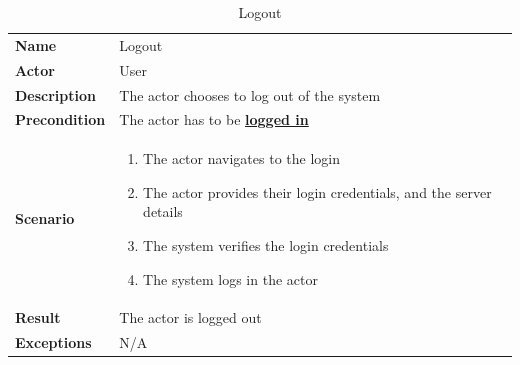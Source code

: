 \begin{table}[ht]
    \caption{Logout}
    \begin{tabular}{|L{5cm}|L{10cm}|}
        \toprule
        \textbf{Name}         & Logout                                                        \\
        \textbf{Actor}        & User                                                          \\
        \textbf{Description}  & The actor chooses to log out of the system                    \\
        \textbf{Precondition} & The actor has to be \textbf{\hyperref[tab:table8]{logged in}} \\
        \textbf{Scenario} &
        \vspace{-0.75cm}
        \begin{enumerate}
            \setlength\itemsep{-0.5em}
            \item The actor navigates to the login
            \item The actor provides their login credentials, and the server details
            \item The system verifies the login credentials
            \item The system logs in the actor
        \end{enumerate} \\[-0.5cm]
        \textbf{Result}       & The actor is logged out                                       \\
        \textbf{Exceptions}   & N/A                                                           \\
        \bottomrule
    \end{tabular}
    \label{tab:table10}
\end{table}

